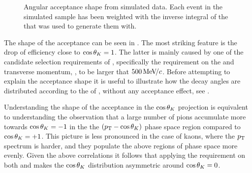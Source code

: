 \begin{figure}[h]
  \centering
  \begin{subfigure}{0.49\textwidth}
    \raggedright
    \scalebox{1.15}{}
    \caption{}
    \label{angAcc_ctk}
  \end{subfigure}%
  \hfill%
  \begin{subfigure}{0.49\textwidth}
    \raggedleft
    \scalebox{1.15}{}
    \caption{}
    \label{angAcc_ctl}
  \end{subfigure}
  \vspace*{0.02\textwidth}
  \begin{subfigure}{0.49\textwidth}
    \raggedright
    \scalebox{1.15}{}
    \caption{}
    \label{angAcc_phi}
  \end{subfigure}
  \caption{Angular acceptance shape from simulated data. Each event in the simulated sample has been weighted with the inverse integral
           of the \pdf that was used to generate them with.}
  \label{angAcc_all}
\end{figure}

The shape of the acceptance can be seen in . The most striking feature is the drop of efficiency
close to $\cos\theta_{K}=1$. The latter is mainly caused by one of the candidate selection requirements of ,
specifically the requirement on the \kaon and \pion transverse momentum, \pt, to be larger that $500{\mathrm{\,Me\kern -0.1em V\!/}c}$.
Before attempting to explain the acceptance shape it is useful to illustrate how the decay angles are
distributed according to the \pdf of , \ie without any acceptance effect, see .

Understanding the shape of the acceptance in the $\cos\theta_{K}$ projection is equivalent to understanding the observation
that a large number of pions accumulate more towards $\cos\theta_{K}=-1$ in the the $(\mbox{$p_{\rm T}$}-\cos\theta_{K})$ phase
space region compared to $\cos\theta_{K}=+1$. This picture is less pronounced in the case of kaons, where the $\mbox{$p_{\rm T}$}$ spectrum
is harder, and they populate the above regions of phase space more evenly. Given the above correlations it follows
that applying the \pt requirement on both \kaon and \pion makes the $\cos\theta_{K}$ distribution asymmetric around $\cos\theta_{K}=0$.


